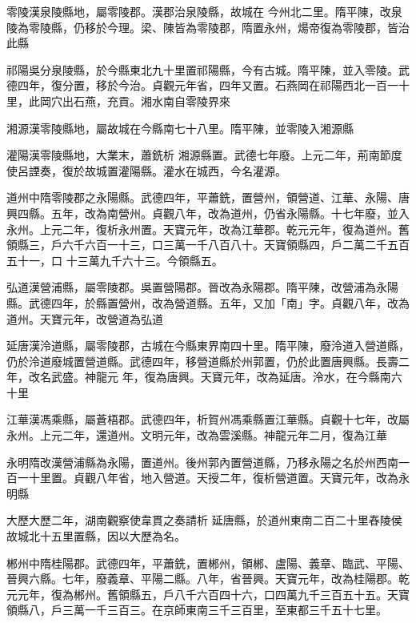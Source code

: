 \begin{pinyinscope}
 零陵漢泉陵縣地，屬零陵郡。漢郡治泉陵縣，故城在
 今州北二里。隋平陳，改泉陵為零陵縣，仍移於今理。梁、陳皆為零陵郡，隋置永州，煬帝復為零陵郡，皆治此縣



 祁陽吳分泉陵縣，於今縣東北九十里置祁陽縣，今有古城。隋平陳，並入零陵。武德四年，復分置，移於今治。貞觀元年省，四年又置。石燕岡在祁陽西北一百一十里，此岡穴出石燕，充貢。湘水南自零陵界來



 湘源漢零陵縣地，屬故城在今縣南七十八里。隋平陳，並零陵入湘源縣



 灌陽漢零陵縣地，大業末，蕭銑析
 湘源縣置。武德七年廢。上元二年，荊南節度使呂諲奏，復於故城置灌陽縣。灌水在城西，今名灌源。



 道州中隋零陵郡之永陽縣。武德四年，平蕭銑，置營州，領營道、江華、永陽、唐興四縣。五年，改為南營州。貞觀八年，改為道州，仍省永陽縣。十七年廢，並入永州。上元二年，復析永州置。天寶元年，改為江華郡。乾元元年，復為道州。舊領縣三，戶六千六百一十三，口三萬一千八百八十。天寶領縣四，戶二萬二千五百五十一，口
 十三萬九千六十三。今領縣五。



 弘道漢營浦縣，屬零陵郡。吳置營陽郡。晉改為永陽郡。隋平陳，改營浦為永陽縣。武德四年，於縣置營州，改為營道縣。五年，又加「南」字。貞觀八年，改為道州。天寶元年，改營道為弘道



 延唐漢泠道縣，屬零陵郡，古城在今縣東界南四十里。隋平陳，廢泠道入營道縣，仍於泠道廢城置營道縣。武德四年，移營道縣於州郭置，仍於此置唐興縣。長壽二年，改名武盛。神龍元
 年，復為唐興。天寶元年，改為延唐。泠水，在今縣南六十里



 江華漢馮乘縣，屬蒼梧郡。武德四年，析賀州馮乘縣置江華縣。貞觀十七年，改屬永州。上元二年，還道州。文明元年，改為雲溪縣。神龍元年二月，復為江華



 永明隋改漢營浦縣為永陽，置道州。後州郭內置營道縣，乃移永陽之名於州西南一百一十里置。貞觀八年省，地入營道。天授二年，復析營道置。天寶元年，改為永明縣



 大歷大歷二年，湖南觀察使韋貫之奏請析
 延唐縣，於道州東南二百二十里舂陵侯故城北十五里置縣，因以大歷為名。



 郴州中隋桂陽郡。武德四年，平蕭銑，置郴州，領郴、盧陽、義章、臨武、平陽、晉興六縣。七年，廢義章、平陽二縣。八年，省晉興。天寶元年，改為桂陽郡。乾元元年，復為郴州。舊領縣五，戶八千六百四十六，口四萬九千三百五十五。天寶領縣八，戶三萬一千三百三。在京師東南三千三百里，至東都三千五十七里。




\end{pinyinscope}
